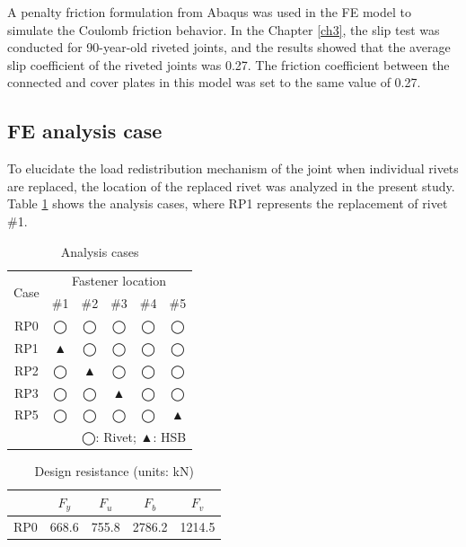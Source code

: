 A penalty friction formulation from Abaqus was used in the FE model to simulate the Coulomb friction behavior. In the Chapter \ref{ch3}, the slip test was conducted for 90-year-old riveted joints, and the results showed that the average slip coefficient
of the riveted joints was 0.27. The friction coefficient between the connected and cover plates in this model was set to the same value of 0.27.

\subsection{FE analysis case}

To elucidate the load redistribution mechanism of the joint when individual rivets are replaced, the location of the replaced rivet was analyzed in the present study. Table \ref{tab-l2} shows the analysis cases, where RP1 represents the replacement of rivet \#1.

\begin{table}[htbp]
\centering
\caption{Analysis cases}\label{tab-l2}
\begin{tabular}{@{}cccccc@{}}
\toprule
\multirow{2}{*}{Case} & \multicolumn{5}{c}{Fastener location} \\ \cmidrule(l){2-6} 
                      & \#1   & \#2   & \#3   & \#4   & \#5   \\ \midrule
RP0                   & ◯     & ◯     & ◯     & ◯     & ◯     \\
RP1                   & ▲     & ◯     & ◯     & ◯     & ◯     \\
RP2                   & ◯     & ▲     & ◯     & ◯     & ◯     \\
RP3                   & ◯     & ◯     & ▲     & ◯     & ◯     \\
RP5                   & ◯     & ◯     & ◯     & ◯     & ▲     \\ \midrule
\multicolumn{6}{r}{◯: Rivet; ▲: HSB}                         
\end{tabular}
\end{table}

\begin{table}[htbp]
\centering
\caption{Design resistance (units: kN)}\label{tab-l3}
\begin{tabular}{@{}ccccc@{}}
\toprule
    & $F_{y}$ & $F_{u}$ & $F_{b}$ & $F_{v}$ \\ \midrule
RP0 & 668.6       & 755.8     & 2786.2   & 1214.5   \\ \bottomrule
\end{tabular}
\end{table}

